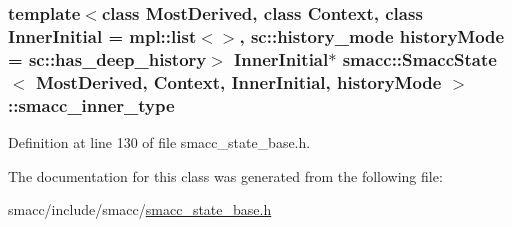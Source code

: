 \subsubsection[{\texorpdfstring{smacc\+\_\+inner\+\_\+type}{smacc_inner_type}}]{\setlength{\rightskip}{0pt plus 5cm}template$<$class Most\+Derived, class Context, class Inner\+Initial = mpl\+::list$<$$>$, sc\+::history\+\_\+mode history\+Mode = sc\+::has\+\_\+deep\+\_\+history$>$ Inner\+Initial$\ast$ {\bf smacc\+::\+Smacc\+State}$<$ Most\+Derived, Context, Inner\+Initial, history\+Mode $>$\+::smacc\+\_\+inner\+\_\+type}\hypertarget{classsmacc_1_1SmaccState_a087d0f66729b98614feb8c59ea548af1}{}\label{classsmacc_1_1SmaccState_a087d0f66729b98614feb8c59ea548af1}


Definition at line 130 of file smacc\+\_\+state\+\_\+base.\+h.



The documentation for this class was generated from the following file\+:\begin{DoxyCompactItemize}
\item 
smacc/include/smacc/\hyperlink{smacc__state__base_8h}{smacc\+\_\+state\+\_\+base.\+h}\end{DoxyCompactItemize}
